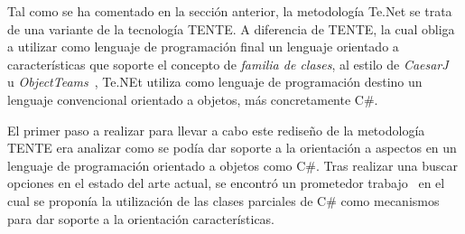 
Tal como se ha comentado en la sección anterior, la metodología Te.Net se trata de una variante de la tecnología TENTE. A diferencia de TENTE, la cual obliga a utilizar como lenguaje de programación final un lenguaje orientado a características que soporte el concepto de \emph{familia de clases}, al estilo de \emph{CaesarJ}~\citep{} u \emph{ObjectTeams}~\citep{}, Te.NEt utiliza como lenguaje de programación destino un lenguaje convencional orientado a objetos, más concretamente C\#.

El primer paso a realizar para llevar a cabo este rediseño de la metodología TENTE era analizar como se podía dar soporte a la orientación a aspectos en un lenguaje de programación orientado a objetos como C\#. Tras realizar una buscar opciones en el estado del arte actual, se encontró un prometedor trabajo~\citep{} en el cual se proponía la utilización de las clases parciales de C\# como mecanismos para dar soporte a la orientación características.


